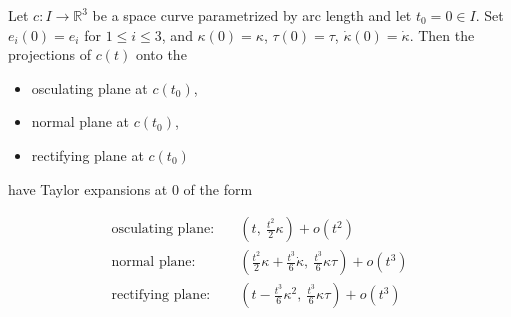 Let $c: I \to \mathbb{R}^3$ be a space curve parametrized by arc length and let $t_0 = 0 \in I$. Set $e_i(0) = e_i$ for $1 \leq i \leq 3$, and $\kappa(0) = \kappa$, $\tau(0) = \tau$, $\dot{\kappa}(0) = \dot{\kappa}$. Then the projections of $c(t)$ onto the

\begin{itemize}
  \item osculating plane at $c(t_0)$,
  \item normal plane at $c(t_0)$,
  \item rectifying plane at $c(t_0)$
\end{itemize}

have Taylor expansions at $0$ of the form

\begin{align*}
\text{osculating plane:}&\quad \left(t,\ \frac{t^2}{2} \kappa\right) + o(t^2)\\[4pt]
\text{normal plane:}&\quad \left(\frac{t^2}{2} \kappa + \frac{t^3}{6} \dot{\kappa},\ \frac{t^3}{6} \kappa \tau\right) + o(t^3)\\[4pt]
\text{rectifying plane:}&\quad \left(t - \frac{t^3}{6} \kappa^2,\ \frac{t^3}{6} \kappa \tau\right) + o(t^3)
\end{align*}
